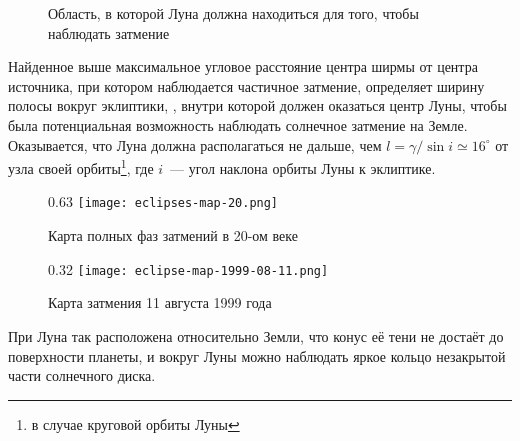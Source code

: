 \begin{wrapfigure}[9]{r}{0.37\tw}
    \centering
    \vspace{-1pc}
    
    \caption{Область, в которой Луна должна находиться для того, чтобы наблюдать затмение}
    \label{pic:elipses-node-distance}    
\end{wrapfigure}
Найденное выше максимальное угловое расстояние центра ширмы от центра источника, при котором наблюдается частичное затмение, определяет ширину полосы вокруг эклиптики, , внутри которой должен оказаться центр Луны, чтобы была потенциальная возможность наблюдать солнечное затмение на Земле. Оказывается, что Луна должна располагаться не дальше, чем $l = \gamma / \sin i \simeq 16^\circ$ от узла своей орбиты\footnote{в случае круговой орбиты Луны}, где $i$~--- угол наклона орбиты Луны к эклиптике. 

\begin{figure}[h!]
    \begin{subcaptionblock}[t]{0.63\tw}
        \texttt{[image: eclipses-map-20.png]}
        \caption{Карта полных фаз затмений в 20-ом веке}
        \label{pic:eclipse-20-century}
    \end{subcaptionblock}
    \hfill
    \begin{subcaptionblock}[t]{0.32\tw}
        \texttt{[image: eclipse-map-1999-08-11.png]}
        \caption{Карта затмения 11 августа 1999 года}
        \label{pic:eclipse-1999-08-11}
    \end{subcaptionblock}
    \caption{}
\end{figure}

% 
%
%    
При  Луна так расположена относительно Земли, что конус её тени не достаёт до поверхности планеты, и вокруг Луны можно наблюдать яркое кольцо незакрытой части солнечного диска.

